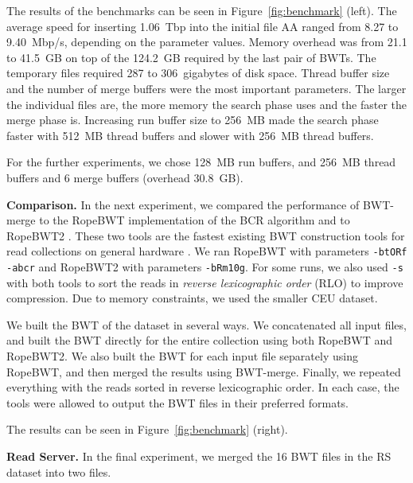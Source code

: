 \documentclass[smallabstract,smallcaptions]{dccpaper}
\newcommand{\BWT}{\textsf{BWT}}
\newcommand{\BWTmerge}{\textsf{BWT\nobreakdash-merge}}
\newcommand{\ropebwt}{\textsf{RopeBWT}}
\newcommand{\ropebwtii}{\textsf{RopeBWT2}}
\newcommand{\CEU}{\textsf{CEU}}
\newcommand{\RS}{\textsf{RS}}
\begin{document}
The results of the benchmarks can be seen in Figure~\ref{fig:benchmark} (left). The average speed for inserting 1.06~Tbp into the initial file AA ranged from 8.27 to 9.40~Mbp/s, depending on the parameter values. Memory overhead was from 21.1 to 41.5~GB on top of the 124.2~GB required by the last pair of \BWT{}s. The temporary files required 287 to 306~gigabytes of disk space. Thread buffer size and the number of merge buffers were the most important parameters. The larger the individual files are, the more memory the search phase uses and the faster the merge phase is. Increasing run buffer size to 256~MB made the search phase faster with 512~MB thread buffers and slower with 256~MB thread buffers.

For the further experiments, we chose 128~MB run buffers, and 256~MB thread buffers and 6 merge buffers (overhead 30.8~GB).

\smallbreak\noindent\textbf{Comparison.} In the next experiment, we compared the performance of \BWTmerge{} to the \ropebwt{} \cite{Li2011-2013} implementation of the BCR algorithm \cite{Bauer2013} and to \ropebwtii{} \cite{Li2014a}. These two tools are the fastest existing \BWT{} construction tools for read collections on general hardware \cite{Li2014a}. We ran \ropebwt{} with parameters \texttt{-btORf -abcr} and \ropebwtii{} with parameters \texttt{-bRm10g}. For some runs, we also used \texttt{-s} with both tools to sort the reads in \emph{reverse lexicographic order} (RLO) to improve compression. Due to memory constraints, we used the smaller \CEU{} dataset.

We built the \BWT{} of the dataset in several ways. We concatenated all input files, and built the \BWT{} directly for the entire collection using both \ropebwt{} and \ropebwtii{}. We also built the \BWT{} for each input file separately using \ropebwt{}, and then merged the results using \BWTmerge{}. Finally, we repeated everything with the reads sorted in reverse lexicographic order. In each case, the tools were allowed to output the \BWT{} files in their preferred formats.

The results can be seen in Figure~\ref{fig:benchmark} (right).

\smallbreak\noindent\textbf{Read Server.} In the final experiment, we merged the 16 \BWT{} files in the \RS{} dataset into two files.


\end{document}
